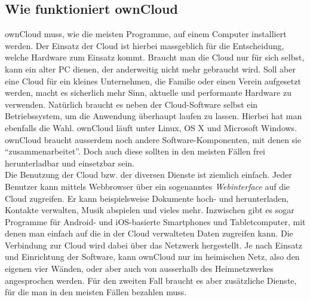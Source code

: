 \subsection{Wie funktioniert ownCloud}
ownCloud muss, wie die meisten Programme, auf einem Computer installiert werden. Der Einsatz der Cloud ist hierbei massgeblich für die Entscheidung, welche Hardware zum Einsatz kommt. Braucht man die Cloud nur für sich selbst, kann ein alter PC dienen, der anderweitig nicht mehr gebraucht wird. Soll aber eine Cloud für ein kleines Unternehmen, die Familie oder einen Verein aufgesetzt werden, macht es sicherlich mehr Sinn, aktuelle und performante Hardware zu verwenden. Natürlich braucht es neben der Cloud-Software selbst ein Betriebssystem, um die Anwendung überhaupt laufen zu lassen. Hierbei hat man ebenfalls die Wahl. ownCloud läuft unter Linux, OS X und Microsoft Windows. ownCloud braucht ausserdem noch andere Software-Komponenten, mit denen sie ``zusammenarbeitet''. Doch auch diese sollten in den meisten Fällen frei herunterladbar und einsetzbar sein.
\\
Die Benutzung der Cloud bzw. der diversen Dienste ist ziemlich einfach. Jeder Benutzer kann mittels Webbrowser über ein sogenanntes \textit{Webinterface} auf die Cloud zugreifen. Er kann beispielsweise Dokumente hoch- und herunterladen, Kontakte verwalten, Musik abspielen und vieles mehr. Inzwischen gibt es sogar Programme für Android- und iOS-basierte Smartphones und Tabletcomputer, mit denen man einfach auf die in der Cloud verwalteten Daten zugreifen kann. Die Verbindung zur Cloud wird dabei über das Netzwerk hergestellt. Je nach Einsatz und Einrichtung der Software, kann ownCloud nur im heimischen Netz, also den eigenen vier Wänden, oder aber auch von ausserhalb des Heimnetzwerkes angesprochen werden. Für den zweiten Fall braucht es aber zusätzliche Dienste, für die man in den meisten Fällen bezahlen muss.

